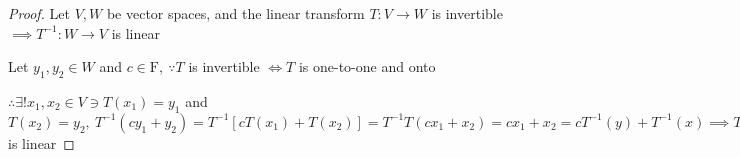 \begin{proof}
	Let $V,W$ be vector spaces, and the linear transform $T:V\rightarrow W$ is invertible $\implies T^{-1}: W \rightarrow V$ is linear
	
	Let $y_1,y_2 \in W$ and $c \in \mathrm{F},~\because T$ is invertible $\Leftrightarrow T$ is one-to-one and onto
	
	$\therefore \exists ! x_1,x_2 \in V \ni T(x_1) = y_1$ and $T(x_2) = y_2,~ T^{-1}(cy_1 + y_2) = T^{-1}[cT(x_1) + T(x_2)] = T^{-1}T(cx_1 + x_2) = cx_1 + x_2 = cT^{-1}(y) + T^{-1}(x) \implies T^{-1}$ is linear
\end{proof}
